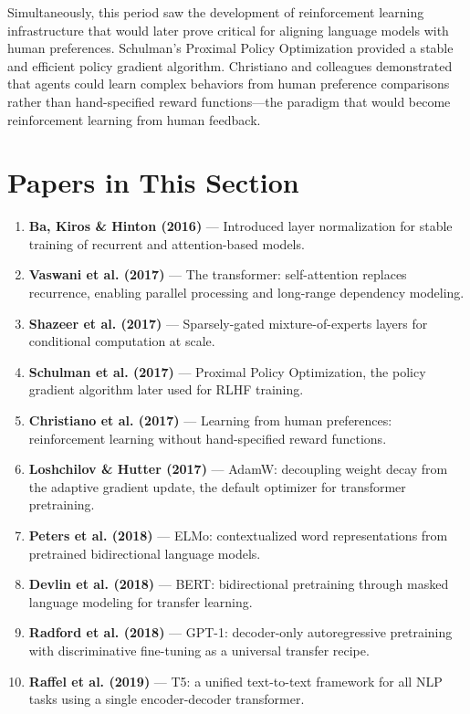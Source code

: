 Simultaneously, this period saw the development of reinforcement learning infrastructure that would later prove critical for aligning language models with human preferences. Schulman's Proximal Policy Optimization provided a stable and efficient policy gradient algorithm. Christiano and colleagues demonstrated that agents could learn complex behaviors from human preference comparisons rather than hand-specified reward functions---the paradigm that would become reinforcement learning from human feedback.

\section*{Papers in This Section}

\begin{enumerate}
\item \textbf{Ba, Kiros \& Hinton (2016)} --- Introduced layer normalization for stable training of recurrent and attention-based models.

\item \textbf{Vaswani et al. (2017)} --- The transformer: self-attention replaces recurrence, enabling parallel processing and long-range dependency modeling.

\item \textbf{Shazeer et al. (2017)} --- Sparsely-gated mixture-of-experts layers for conditional computation at scale.

\item \textbf{Schulman et al. (2017)} --- Proximal Policy Optimization, the policy gradient algorithm later used for RLHF training.

\item \textbf{Christiano et al. (2017)} --- Learning from human preferences: reinforcement learning without hand-specified reward functions.

\item \textbf{Loshchilov \& Hutter (2017)} --- AdamW: decoupling weight decay from the adaptive gradient update, the default optimizer for transformer pretraining.

\item \textbf{Peters et al. (2018)} --- ELMo: contextualized word representations from pretrained bidirectional language models.

\item \textbf{Devlin et al. (2018)} --- BERT: bidirectional pretraining through masked language modeling for transfer learning.

\item \textbf{Radford et al. (2018)} --- GPT-1: decoder-only autoregressive pretraining with discriminative fine-tuning as a universal transfer recipe.

\item \textbf{Raffel et al. (2019)} --- T5: a unified text-to-text framework for all NLP tasks using a single encoder-decoder transformer.
\end{enumerate}
